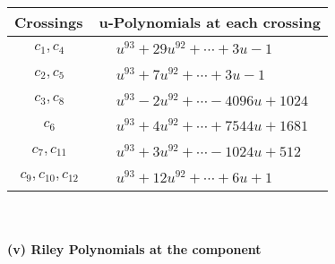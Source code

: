 \documentclass[1p]{elsarticle_modified}
\theoremstyle{definition}
\begin{document}
\begin{tabular}{m{50pt}|m{274pt}}
Crossings & \hspace{64pt}u-Polynomials at each crossing \\
\hline $$\begin{aligned}c_{1},c_{4}\end{aligned}$$&$\begin{aligned}
&u^{93}+29 u^{92}+\cdots+3 u-1
\end{aligned}$\\
\hline $$\begin{aligned}c_{2},c_{5}\end{aligned}$$&$\begin{aligned}
&u^{93}+7 u^{92}+\cdots+3 u-1
\end{aligned}$\\
\hline $$\begin{aligned}c_{3},c_{8}\end{aligned}$$&$\begin{aligned}
&u^{93}-2 u^{92}+\cdots-4096 u+1024
\end{aligned}$\\
\hline $$\begin{aligned}c_{6}\end{aligned}$$&$\begin{aligned}
&u^{93}+4 u^{92}+\cdots+7544 u+1681
\end{aligned}$\\
\hline $$\begin{aligned}c_{7},c_{11}\end{aligned}$$&$\begin{aligned}
&u^{93}+3 u^{92}+\cdots-1024 u+512
\end{aligned}$\\
\hline $$\begin{aligned}c_{9},c_{10},c_{12}\end{aligned}$$&$\begin{aligned}
&u^{93}+12 u^{92}+\cdots+6 u+1
\end{aligned}$\\
\hline
\end{tabular}\\~\\
\newpage\renewcommand{\arraystretch}{1}
\flushleft \textbf{(v) Riley Polynomials at the component}\newline \\
\end{document}
